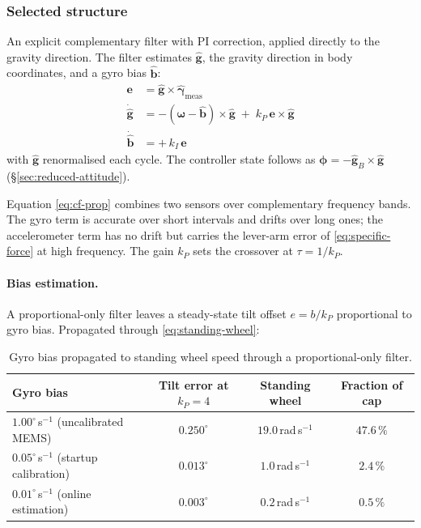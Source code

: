 \subsubsection{Selected structure}
\label{sec:chosen}

An explicit complementary filter with PI correction, applied directly to the
gravity direction. The filter estimates $\hat{\bm{g}}$, the gravity direction
in body coordinates, and a gyro bias $\hat{\bm{b}}$:
%
\begin{align}
  \bm{e} &= \hat{\bm{g}}\times\hat{\bm{\gamma}}_{\mathrm{meas}}
    \label{eq:cf-error}\\
  \dot{\hat{\bm{g}}} &= -\left(\bm{\omega}-\hat{\bm{b}}\right)\times\hat{\bm{g}}
     \;+\; k_P\,\bm{e}\times\hat{\bm{g}}
    \label{eq:cf-prop}\\
  \dot{\hat{\bm{b}}} &= +\,k_I\,\bm{e}
    \label{eq:cf-bias}
\end{align}
%
with $\hat{\bm{g}}$ renormalised each cycle. The controller state follows as
$\bm{\phi} = -\hat{\bm{g}}_B\times\hat{\bm{g}}$
(\S\ref{sec:reduced-attitude}).

Equation \eqref{eq:cf-prop} combines two sensors over complementary frequency
bands. The gyro term is accurate over short intervals and drifts over long
ones; the accelerometer term has no drift but carries the lever-arm error of
\eqref{eq:specific-force} at high frequency. The gain $k_P$ sets the
crossover at $\tau = 1/k_P$.

\paragraph{Bias estimation.} A proportional-only filter leaves a steady-state
tilt offset $e = b/k_P$ proportional to gyro bias. Propagated through
\eqref{eq:standing-wheel}:

\begin{table}[htbp]
\centering
\small
\begin{tabular}{@{}lccc@{}}
\toprule
\textbf{Gyro bias} & \textbf{Tilt error at $k_P = 4$}
& \textbf{Standing wheel} & \textbf{Fraction of cap}\\
\midrule
$1.00^\circ$\,s$^{-1}$ (uncalibrated MEMS) & $0.250^\circ$ & $19.0$\,rad\,s$^{-1}$ & $47.6\,\%$\\
$0.05^\circ$\,s$^{-1}$ (startup calibration) & $0.013^\circ$ & $1.0$\,rad\,s$^{-1}$ & $2.4\,\%$\\
$0.01^\circ$\,s$^{-1}$ (online estimation) & $0.003^\circ$ & $0.2$\,rad\,s$^{-1}$ & $0.5\,\%$\\
\bottomrule
\end{tabular}
\caption{Gyro bias propagated to standing wheel speed through a
proportional-only filter.}
\label{tab:gyro-bias}
\end{table}

